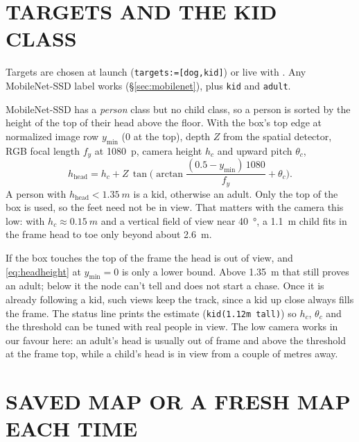 \section{TARGETS AND THE KID CLASS}
\label{sec:kids}

Targets are chosen at launch (\texttt{targets:=[dog,kid]}) or live with
. Any MobileNet-SSD label works
(\S\ref{sec:mobilenet}), plus \texttt{kid} and \texttt{adult}.

MobileNet-SSD has a \emph{person} class but no child class, so a person is
sorted by the height of the top of their head above the floor. With the box's
top edge at normalized image row $y_{\min}$ (0 at the top), depth $Z$ from the
spatial detector, RGB focal length $f_y$ at \SI{1080}{p}, camera height $h_c$
and upward pitch $\theta_c$,
\begin{equation}\label{eq:headheight}
h_{\mathrm{head}} = h_c + Z\,\tan\!\Big(\arctan\frac{(0.5-y_{\min})\,1080}{f_y}+\theta_c\Big).
\end{equation}
A person with $h_{\mathrm{head}}<\SI{1.35}{m}$ is a kid, otherwise an adult.
Only the top of the box is used, so the feet need not be in view. That matters
with the camera this low: with $h_c\approx\SI{0.15}{m}$ and a vertical field of
view near \SI{40}{\degree}, a \SI{1.1}{m} child fits in the frame head to toe
only beyond about \SI{2.6}{m}.

If the box touches the top of the frame the head is out of view, and
\eqref{eq:headheight} at $y_{\min}=0$ is only a lower bound. Above
\SI{1.35}{m} that still proves an adult; below it the node can't tell and does
not start a chase. Once it is already following a kid, such views keep the
track, since a kid up close always fills the frame. The status line prints the
estimate (\texttt{kid(1.12m tall)}) so $h_c$, $\theta_c$ and the threshold can
be tuned with real people in view. The low camera works in our favour here:
an adult's head is usually out of frame and above the threshold at the frame
top, while a child's head is in view from a couple of metres away.

\section{SAVED MAP OR A FRESH MAP EACH TIME}
\label{sec:savedmap}

